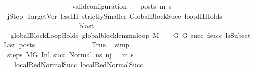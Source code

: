 \begin{isabellebody}
\ \ \ \ \ \ \ \ \ \ \ \ \ \ \ \ \ \ \isamarkupfalse%
\ {\isachardoublequoteopen}valid{\isacharunderscore}{\kern0pt}configuration\ {\isasymLambda}\ {\isasymGamma}\ {\isasymOmega}\ posts\ m{\isacharprime}{\kern0pt}\ s{\isacharprime}{\kern0pt}{\isachardoublequoteclose}\isanewline
\ \ \ \ \ \ \ \ \ \ \ \ \ \ \ \ \ \ \ \ \isamarkupfalse%
\ j{\isacharprime}{\kern0pt}Step\ TargetVer\ less{\isachardot}{\kern0pt}IH\ strictlySmaller\ GlobalBlockSucc\ loopIHHolds\isanewline
\ \ \ \ \ \ \ \ \ \ \ \ \ \ \ \ \ \ \ \ \isamarkupfalse%
\ blast\isanewline
\ \ \ \ \ \ \ \ \ \ \ \ \ \ \ \ \isamarkupfalse%
\isanewline
\ \ \ \ \ \ \ \ \ \ \ \ \ \ \isamarkupfalse%
\isanewline
\ \ \ \ \ \ \ \ \ \ \ \ \isamarkupfalse%
\ \ globalBlockLoopHolds{\isacharcolon}{\kern0pt}\ {\isachardoublequoteopen}global{\isacharunderscore}{\kern0pt}block{\isacharunderscore}{\kern0pt}lemma{\isacharunderscore}{\kern0pt}loop\ M\ {\isasymLambda}\ {\isasymGamma}\ {\isasymOmega}\ G\ G{\isacharprime}{\kern0pt}\ succ\ {\isacharparenleft}{\kern0pt}f{\isacharparenleft}{\kern0pt}succ{\isacharparenright}{\kern0pt}{\isacharparenright}{\kern0pt}\ lsSubsetList\ posts{\isachardoublequoteclose}\isanewline
\ \ \ \ \ \ \ \ \ \ \ \ \ \ \isamarkupfalse%
\ True\ \isamarkupfalse%
\ simp\isanewline
\ \ \ \ \ \ \ \ \ \ \ \ \isamarkupfalse%
\ steps{\isacharcolon}{\kern0pt}\ {\isachardoublequoteopen}M{\isacharcomma}{\kern0pt}{\isasymLambda}{\isacharcomma}{\kern0pt}{\isasymGamma}{\isacharcomma}{\kern0pt}{\isasymOmega}{\isacharcomma}{\kern0pt}G\ {\isasymturnstile}{\isacharparenleft}{\kern0pt}Inl\ succ{\isacharcomma}{\kern0pt}\ Normal\ ns{\isacharprime}{\kern0pt}{\isacharparenright}{\kern0pt}\ {\isacharminus}{\kern0pt}n{\isasymrightarrow}{\isacharcircum}{\kern0pt}{\isacharparenleft}{\kern0pt}j\ {\isacharminus}{\kern0pt}\ {}{\isacharparenright}{\kern0pt}\ {\isacharparenleft}{\kern0pt}m{\isacharprime}{\kern0pt}{\isacharcomma}{\kern0pt}\ s{\isacharprime}{\kern0pt}{\isacharparenright}{\kern0pt}{\isachardoublequoteclose}\isanewline
\ \ \ \ \ \ \ \ \ \ \ \ \ \ \isamarkupfalse%
\ {\isachardoublequoteopen}{}{\isachardoublequoteclose}{\isacharparenleft}{\kern0pt}{}{\isacharparenright}{\kern0pt}\ {\isachardoublequoteopen}{}{\isachardoublequoteclose}{\isacharparenleft}{\kern0pt}{}{\isacharparenright}{\kern0pt}\ local{\isachardot}{\kern0pt}RedNormalSucc{\isacharparenleft}{\kern0pt}{}{\isacharparenright}{\kern0pt}\ local{\isachardot}{\kern0pt}RedNormalSucc{\isacharparenleft}{\kern0pt}{}{\isacharparenright}{\kern0pt}\ \isamarkupfalse%

\end{isabellebody}
